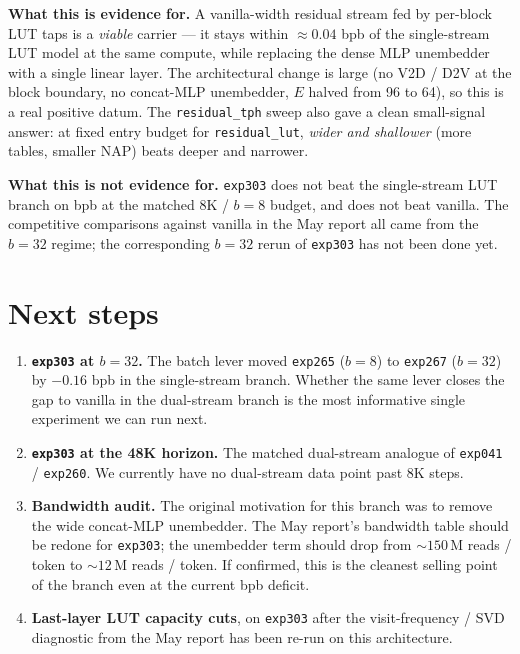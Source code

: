 \documentclass[11pt]{article}
\begin{document}
\noindent\textbf{What this is evidence for.}
A vanilla-width residual stream fed by per-block LUT taps is a \emph{viable} carrier --- it stays within $\approx 0.04$ bpb of the single-stream LUT model at the same compute, while replacing the dense MLP unembedder with a single linear layer.
The architectural change is large (no V2D / D2V at the block boundary, no concat-MLP unembedder, $E$ halved from 96 to 64), so this is a real positive datum.
The \texttt{residual\_tph} sweep also gave a clean small-signal answer: at fixed entry budget for \texttt{residual\_lut}, \emph{wider and shallower} (more tables, smaller NAP) beats deeper and narrower.

\noindent\textbf{What this is not evidence for.}
\texttt{exp303} does not beat the single-stream LUT branch on bpb at the matched 8K / $b{=}8$ budget, and does not beat vanilla.
The competitive comparisons against vanilla in the May report all came from the $b{=}32$ regime; the corresponding $b{=}32$ rerun of \texttt{exp303} has not been done yet.

\section{Next steps}
\label{sec:next}

\begin{enumerate}
\setlength{\itemsep}{1pt}
    \item \textbf{\texttt{exp303} at $b{=}32$.} The batch lever moved \texttt{exp265} ($b{=}8$) to \texttt{exp267} ($b{=}32$) by $-0.16$ bpb in the single-stream branch. Whether the same lever closes the gap to vanilla in the dual-stream branch is the most informative single experiment we can run next.
    \item \textbf{\texttt{exp303} at the 48K horizon.} The matched dual-stream analogue of \texttt{exp041} / \texttt{exp260}. We currently have no dual-stream data point past 8K steps.
    \item \textbf{Bandwidth audit.} The original motivation for this branch was to remove the wide concat-MLP unembedder. The May report's bandwidth table should be redone for \texttt{exp303}; the unembedder term should drop from $\sim$$150$\,M reads / token to $\sim$$12$\,M reads / token. If confirmed, this is the cleanest selling point of the branch even at the current bpb deficit.
    \item \textbf{Last-layer LUT capacity cuts}, on \texttt{exp303} after the visit-frequency / SVD diagnostic from the May report has been re-run on this architecture.
\end{enumerate}
\end{document}
